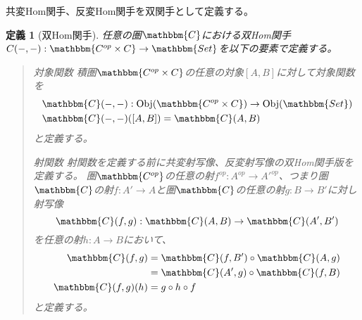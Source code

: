 \documentclass[uplatex,dvipdfmx]{jsarticle}
\newcommand{\cat}[1]{\mathbbm{#1}}
\newcommand{\arrow}{\rightarrow}
\newcommand{\functor}[3]{#1:\cat{#2}\arrow \cat{#3}}
\newcommand{\obj}[1]{\mathrm{Obj}(\cat{#1})}
\newcommand{\mor}[3]{#1:#2\arrow #3}
\newcommand{\arset}[3]{\cat{#1}(#2,#3)}
\newtheorem{define}[proof]{定義}
\numberwithin{proof}{subsection}
\newenvironment{mydescription}
{\begin{description}
  \setlength{\parskip}{0.5cm}
}
{\end{description}}
\begin{document}
	共変Hom関手、反変Hom関手を双関手として定義する。
	\begin{define}[双Hom関手]
		任意の圏$\cat{C}$における双Hom関手$\functor{C(-,-)}{C^{op}\times C}{Set}$を以下の要素で定義する。
		\begin{quote}
			\begin{mydescription}
				\item[対象関数] 積圏$\cat{C^{op}\times C}$の任意の対象$[A,B]$に対して対象関数を
				\begin{align*}
					&\mor{\arset{C}{-}{-}}{\obj{C^{op}\times C}}{\obj{Set}}\\
					&\arset{C}{-}{-}([A,B])=\arset{C}{A}{B}
				\end{align*}
				と定義する。
				\item[射関数]射関数を定義する前に共変射写像、反変射写像の双Hom関手版を定義する。
				圏$\cat{C^{op}}$の任意の射$\mor{f^{op}}{A^{op}}{A'^{op}}$、つまり圏$\cat{C}$の射$\mor{f}{A'}{A}$と圏$\cat{C}$の任意の射$\mor{g}{B}{B'}$に対し射写像\[\mor{\arset{C}{f}{g}}{\arset{C}{A}{B}}{\arset{C}{A'}{B'}}\]を任意の射$\mor{h}{A}{B}$において、
				\begin{align*}
					\arset{C}{f}{g}&=\arset{C}{f}{B'}\circ\arset{C}{A}{g}\\
					&=\arset{C}{A'}{g}\circ\arset{C}{f}{B}\\
					\arset{C}{f}{g}(h)&=g\circ h\circ f\\
				\end{align*}
				と定義する。

				\begin{center}
				\end{center}


\end{mydescription}
\end{quote}
\end{define}
\end{document}
